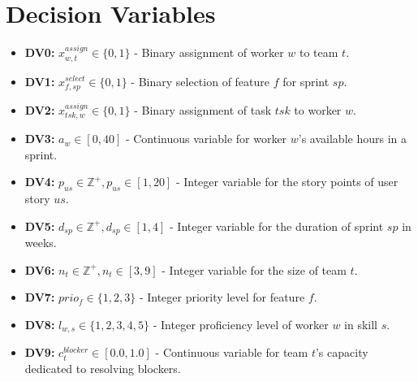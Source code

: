 \documentclass[11pt]{article}
\begin{document}
\section{Decision Variables}
\begin{itemize}
    \item \textbf{DV0:} $x_{w, t}^{assign} \in \{0, 1\}$ - Binary assignment of worker $w$ to team $t$.
    \item \textbf{DV1:} $x_{f, sp}^{select} \in \{0, 1\}$ - Binary selection of feature $f$ for sprint $sp$.
    \item \textbf{DV2:} $x_{tsk, w}^{assign} \in \{0, 1\}$ - Binary assignment of task $tsk$ to worker $w$.
    \item \textbf{DV3:} $a_w \in [0, 40]$ - Continuous variable for worker $w$'s available hours in a sprint.
    \item \textbf{DV4:} $p_{us} \in \mathbb{Z}^+, p_{us} \in [1, 20]$ - Integer variable for the story points of user story $us$.
    \item \textbf{DV5:} $d_{sp} \in \mathbb{Z}^+, d_{sp} \in [1, 4]$ - Integer variable for the duration of sprint $sp$ in weeks.
    \item \textbf{DV6:} $n_t \in \mathbb{Z}^+, n_t \in [3, 9]$ - Integer variable for the size of team $t$.
    \item \textbf{DV7:} $prio_f \in \{1, 2, 3\}$ - Integer priority level for feature $f$.
    \item \textbf{DV8:} $l_{w,s} \in \{1, 2, 3, 4, 5\}$ - Integer proficiency level of worker $w$ in skill $s$.
    \item \textbf{DV9:} $c_{t}^{blocker} \in [0.0, 1.0]$ - Continuous variable for team $t$'s capacity dedicated to resolving blockers.
\end{itemize}
\end{document}
